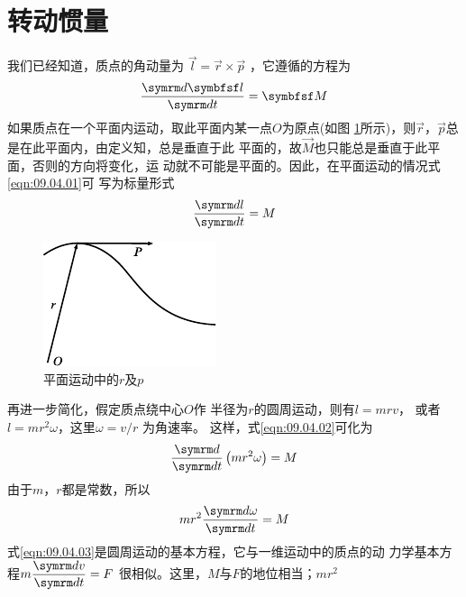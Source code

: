 \section{转动惯量}\label{sec:09.04}

我们已经知道，质点的角动量为 $ \vec{ l } = \vec{ r } \times  \vec{ p }$  ，它遵循的方程为
\begin{equation}\label{eqn:09.04.01}
  \frac { \dif \vec{l} } { \dif t } = \vec{M}
\end{equation}
如果质点在一个平面内运动，取此平面内某一点$ O $为原点(如图
\ref{fig:09.10}所示)，则$ \vec{ r } $，$ \vec{ p } $总是在此平面内，由定义知，总是垂直于此
平面的，故$ \vec{M} $也只能总是垂直于此平面，否则的方向将变化，运
\clearpage\noindent
动就不可能是平面的。因此，在平面运动的情况\lhbrak  式\eqref{eqn:09.04.01}\rhbrak 可
写为标量形式
\begin{equation}\label{eqn:09.04.02}
  \frac { \dif l } { \dif t } = M
\end{equation}
\begin{figure}
    \centering
    \includegraphics{figure/fig09.10}
    \caption{平面运动中的$ r $及$ p $}
    \label{fig:09.10}
\end{figure}
再进一步简化，假定质点绕中心$ O $作
半径为$ r $的圆周运动，则有$  l = m r v   $，
或者$  l = m r ^ { 2 } \omega   $，这里$  \omega = v / r $ 为角速率。
这样，式\eqref{eqn:09.04.02}可化为
\begin{equation*}
  \frac { \dif } { \dif t } \left( m r ^ { 2 } \omega \right) = M
\end{equation*}
由于$ m $，$ r $都是常数，所以
\begin{equation}\label{eqn:09.04.03}
  m r ^ { 2 } \frac { \dif \omega } { \dif t } = M
\end{equation}
式\eqref{eqn:09.04.03}是圆周运动的基本方程，它与一维运动中的质点的动
力学基本方程$ m \dfrac { \dif v } { \dif t } = F $ 很相似。这里，$ M $与$ F $的地位相当；$ m r ^ 2 $

